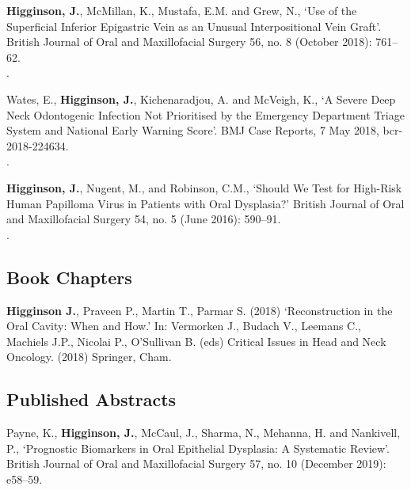  \textbf{Higginson, J.}, McMillan, K., Mustafa, E.M.  and Grew, N., `Use of the Superficial Inferior Epigastric Vein as an Unusual Interpositional Vein Graft’. British Journal of Oral and Maxillofacial Surgery 56, no. 8 (October 2018): 761–62. 
\\.

\vspace{0.1cm}

 Wates, E., \textbf{Higginson, J.}, Kichenaradjou, A. and McVeigh, K., `A Severe Deep Neck Odontogenic Infection Not Prioritised by the Emergency Department Triage System and National Early Warning Score’. BMJ Case Reports, 7 May 2018, bcr-2018-224634. 
\\.

\vspace{0.1cm}

 \textbf{Higginson, J.}, Nugent, M., and Robinson, C.M., `Should We Test for High-Risk Human Papilloma Virus in Patients with Oral Dysplasia?’ British Journal of Oral and Maxillofacial Surgery 54, no. 5 (June 2016): 590–91. 
\\.



\subsection*{Book Chapters}

 \textbf{Higginson J.}, Praveen P., Martin T., Parmar S. (2018) `Reconstruction in the Oral Cavity: When and How.' In: Vermorken J., Budach V., Leemans C., Machiels J.P., Nicolai P., O'Sullivan B. (eds) Critical Issues in Head and Neck Oncology. (2018) Springer, Cham. 
\\



\subsection*{Published Abstracts}

 Payne, K., \textbf{Higginson, J.}, McCaul, J., Sharma, N., Mehanna, H. and Nankivell, P., `Prognostic Biomarkers in Oral Epithelial Dysplasia: A Systematic Review’. British Journal of Oral and Maxillofacial Surgery 57, no. 10 (December 2019): e58–59. 
\\

